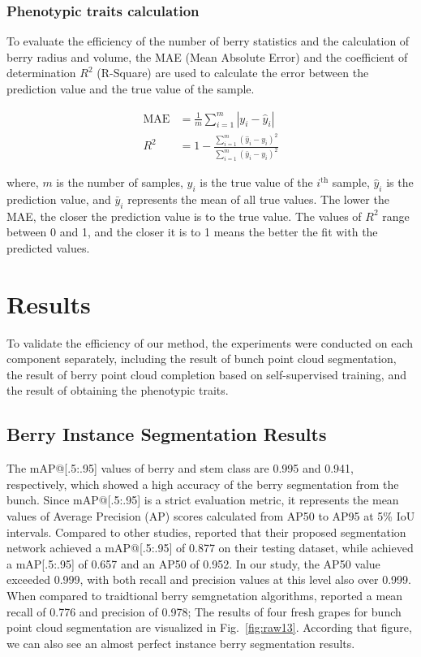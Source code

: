 \documentclass[12pt]{article}
\begin{document}
\subsubsection{Phenotypic traits calculation}
\label{sec:253}
To evaluate the efficiency of the number of berry statistics and the calculation of berry radius and volume, the MAE (Mean Absolute Error) and the coefficient of determination $R^2$ (R-Square) are used to calculate the error between the prediction value and the true value of the sample.

\begin{align}
    \text{MAE} &= \frac{1}{m} \sum_{i=1}^{m} |y_i - \hat{y}_i| \tag{12}\\
    R^2 &= 1 - \frac{\sum_{i=1}^{m} (\hat{y}_i - y_i)^2}{\sum_{i=1}^{m} (\bar{y}_i - y_i)^2} \tag{13}
\end{align}

{\raggedright where, $m$ is the number of samples, $y_i$ is the true value of the $i^{\text{th}}$ sample, $\hat{y}_i$ is the prediction value, and $\bar{y}_i$ represents the mean of all true values. 
The lower the MAE, the closer the prediction value is to the true value. The values of $R^2$ range between 0 and 1, and the closer it is to 1 means the better the fit with the predicted values.}

\section{Results}

To validate the efficiency of our method, the experiments were conducted on each component separately, including the result of bunch point cloud segmentation, the result of berry point cloud completion based on self-supervised training, and the result of obtaining the phenotypic traits.

\subsection{Berry Instance Segmentation Results}
\label{sec:insegresults}

The mAP@[.5:.95] values of berry and stem class are 0.995 and 0.941, respectively, which showed a high accuracy of the berry segmentation from the bunch.
Since mAP@[.5:.95] is a strict evaluation metric, it represents the mean values of Average Precision (AP) scores calculated from AP50 to AP95 at 5\% IoU intervals.
Compared to other studies, \citet{ni_threedimensional_2021} reported that their proposed segmentation network achieved a mAP@[.5:.95] of 0.877 on their testing dataset, while \citet{du_instance_2023} achieved a mAP[.5:.95] of 0.657 and an AP50 of 0.952.
In our study, the AP50 value exceeded 0.999, with both recall and precision values at this level also over 0.999.
When compared to traidtional berry semgnetation algorithms, \citet{rose_automated_2016} reported a mean recall of 0.776 and precision of 0.978;
The results of four fresh grapes for bunch point cloud segmentation are visualized in Fig.~\ref{fig:raw13}.
According that figure, we can also see an almost perfect instance berry segmentation results.
\end{document}
